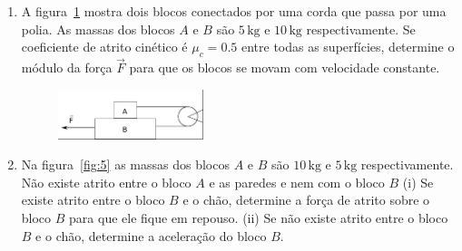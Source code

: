 \documentclass[twocolumn=on,DIV=calc]{scrartcl}
\newcommand{\un}[1]{\mathrm{#1}}
\begin{document}
\begin{enumerate}
\begin{figure}[ht]
  \end{figure}
\item A figura~\ref{fig:8} mostra dois blocos conectados por uma corda
  que passa por uma polia. As massas dos blocos $A$ e $B$ são
  $5\,\un{kg}$ e $10\,\un{kg}$ respectivamente. Se coeficiente de
  atrito cinético é $\mu_c=0.5$ entre todas as superfícies, determine
  o módulo da força $\vec F$ para que os blocos se movam com
  velocidade constante.
  \begin{figure}[ht]
    \centering
    \includegraphics[width=0.4\textwidth,keepaspectratio]{lista4-questao8.pdf}
    \caption{}
    \label{fig:8}
  \end{figure}
\item Na figura~\ref{fig:5} as massas dos blocos $A$ e $B$ são
  $10\,\un{kg}$ e $5\,\un{kg}$ respectivamente. Não existe atrito
  entre o bloco $A$ e as paredes e nem com o bloco $B$ (i) Se existe
  atrito entre o bloco $B$ e o chão, determine a força de atrito sobre
  o bloco $B$ para que ele fique em repouso. (ii) Se não existe atrito
  entre o bloco $B$ e o chão, determine a aceleração do bloco $B$.


\end{enumerate}
\end{document}
